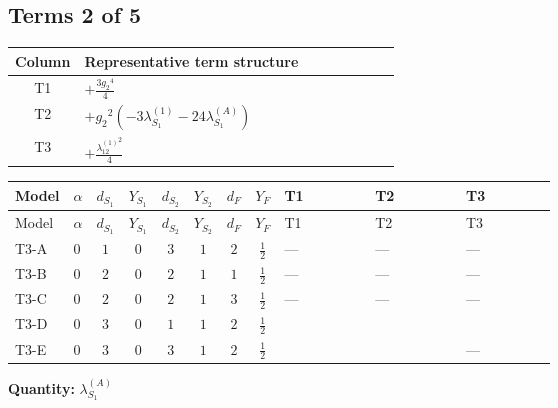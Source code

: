 \documentclass[8pt]{article}
\begin{document}
\begin{landscape}
\subsection*{Terms 2 of 5}
\begin{center}
\begin{tabular}{@{}c >{\raggedright\arraybackslash}p{0.82\linewidth}@{}}
\toprule
Column & Representative term structure \\
\midrule
T1 & \(\displaystyle +\frac{3 {g_2}^4}{4}\) \\
\midrule
T2 & \(\displaystyle +{g_2}^2 (-3 {\lambda_{S_1}^{(1)}}-24 {\lambda_{S_1}^{(A)}})\) \\
\midrule
T3 & \(\displaystyle +\frac{{\lambda_{12}^{(1)}}^2}{4}\) \\
\midrule
\bottomrule
\end{tabular}
\end{center}
\smallskip
\tiny
\begin{longtable}{@{}llcccccc >{\raggedright\arraybackslash}p{0.21\linewidth} >{\raggedright\arraybackslash}p{0.21\linewidth} >{\raggedright\arraybackslash}p{0.21\linewidth}@{}}
\toprule
Model & $\alpha$ & $d_{S_1}$ & $Y_{S_1}$ & $d_{S_2}$ & $Y_{S_2}$ & $d_F$ & $Y_F$ & T1 & T2 & T3 \\
\midrule
\endfirsthead
\toprule
Model & $\alpha$ & $d_{S_1}$ & $Y_{S_1}$ & $d_{S_2}$ & $Y_{S_2}$ & $d_F$ & $Y_F$ & T1 & T2 & T3 \\
\midrule
\endhead
T3-A & $0$ & $1$ & $0$ & $3$ & $1$ & $2$ & $\frac{1}{2}$ & --- & --- & --- \\
\midrule
T3-B & $0$ & $2$ & $0$ & $2$ & $1$ & $1$ & $\frac{1}{2}$ & --- & --- & --- \\
\midrule
T3-C & $0$ & $2$ & $0$ & $2$ & $1$ & $3$ & $\frac{1}{2}$ & --- & --- & --- \\
\midrule
T3-D & $0$ & $3$ & $0$ & $1$ & $1$ & $2$ & $\frac{1}{2}$ & \scriptsize\adjustbox{max width=\linewidth}{$\begin{gathered} +\frac{3 {g_2}^4}{4}\end{gathered}$} & \scriptsize\adjustbox{max width=\linewidth}{$\begin{gathered} +{g_2}^2 (-3 {\lambda_{S_1}^{(1)}}-24 {\lambda_{S_1}^{(A)}})\end{gathered}$} & \scriptsize\adjustbox{max width=\linewidth}{$\begin{gathered} +\frac{{\lambda_{12}^{(1)}}^2}{4}\end{gathered}$} \\
\midrule
T3-E & $0$ & $3$ & $0$ & $3$ & $1$ & $2$ & $\frac{1}{2}$ & \scriptsize\adjustbox{max width=\linewidth}{$\begin{gathered} +\frac{3 {g_2}^4}{4}\end{gathered}$} & \scriptsize\adjustbox{max width=\linewidth}{$\begin{gathered} +{g_2}^2 (-3 {\lambda_{S_1}^{(1)}}-24 {\lambda_{S_1}^{(A)}})\end{gathered}$} & --- \\
\midrule
\bottomrule
\end{longtable}
\clearpage
\noindent\textbf{Quantity: }$\lambda_{S_1}^{(A)}$\par\smallskip

\end{landscape}
\end{document}
